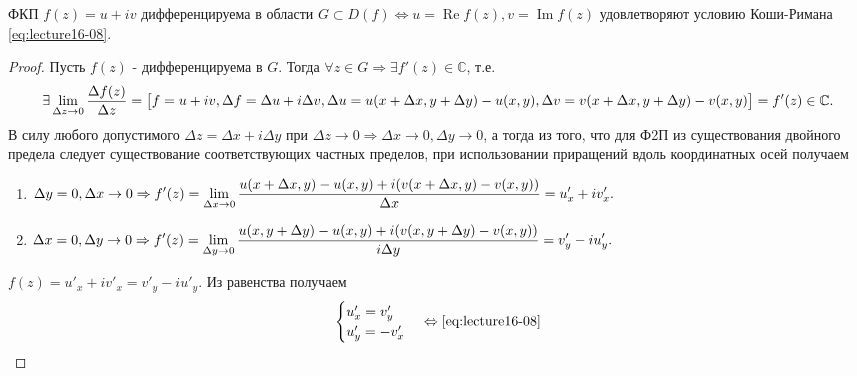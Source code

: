 \begin{theorem}
  ФКП $f(z) = u + iv$ дифференцируема в области $G \subset D(f) \Leftrightarrow
  u = \operatorname{Re}f(z), v = \operatorname{Im}f(z)$ удовлетворяют условию Коши-Римана
  \eqref{eq:lecture16-08}.
\end{theorem}
\begin{proof}
  \circled{$\Rightarrow$} Пусть $f(z)$ - дифференцируема в $G$. Тогда $\forall z \in G \Rightarrow
  \exists f'(z) \in \mathbb{C}$, т.е.
  \begin{align*}
    \exists\lim\limits_{\Delta z \to 0}\dfrac{\Delta f(z)}{\Delta z} = \left[\begin{matrix}
      f = u + iv,
      \Delta f = \Delta u + i\Delta v,
      \Delta u = u(x + \Delta x, y + \Delta y) - u(x, y),
      \Delta v = v(x + \Delta x, y + \Delta y) - v(x, y)\end{matrix}\right] = f'(z) \in \mathbb{C}.
  \end{align*}
  В силу любого допустимого $\Delta z = \Delta x + i \Delta y$ при $\Delta z \to 0 \Rightarrow
  \Delta x \to 0, \Delta y \to 0$, а тогда из того, что для Ф2П из существования двойного предела
  следует существование соответствующих частных пределов, при использовании приращений вдоль
  координатных осей получаем
  \begin{enumerate}
  \item $\begin{aligned}[t]
    \Delta y = 0, \Delta x \to 0 \Rightarrow f'(z) = \lim\limits_{\Delta x \to 0}
    \dfrac{u(x + \Delta x, y) - u(x, y) + i(v(x + \Delta x, y) - v(x, y))}{\Delta x} =
    u'_x + iv'_x.
  \end{aligned}$
  \item $\begin{aligned}[t]
    \Delta x = 0, \Delta y \to 0 \Rightarrow f'(z) = \lim\limits_{\Delta y \to 0}
    \dfrac{u(x, y + \Delta y) - u(x, y) + i(v(x, y + \Delta y) - v(x, y))}{i\Delta y} =
    v'_y - iu'_y.
  \end{aligned}$
  \end{enumerate}

  $f(z) = u'_x + iv'_x = v'_y - iu'_y$. Из равенства получаем
  \begin{equation}
    \begin{cases}
      u'_x = v'_y\\
      u'_y = -v'_x\\
    \end{cases} \Leftrightarrow \eqref{eq:lecture16-08}
  \end{equation}


\end{proof}
